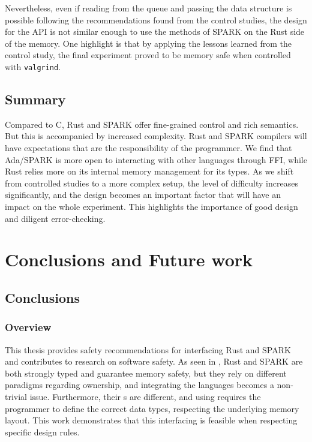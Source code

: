 \documentclass[nomenclature, english, bibtex]{kththesis}
\begin{document}
{\begin{figure}
    \label{fig:memBBqueue}
\end{figure}


Nevertheless, even if reading from the queue and passing the data structure is possible following the recommendations found from the control studies, the design for the API is not similar enough to use the methods of SPARK on the Rust side of the memory.
One highlight is that by applying the lessons learned from the control study, the final experiment proved to be memory safe when controlled with \texttt{valgrind}.

\section{Summary}

Compared to C, Rust and SPARK offer fine-grained control and rich semantics. But this is accompanied by increased complexity. Rust and SPARK compilers will have expectations that are the responsibility of the programmer. We find that Ada/SPARK is more open to interacting with other languages through \gls{FFI}, while Rust relies more on its internal memory management for its types.
As we shift from controlled studies to a more complex setup, the level of difficulty increases significantly, and the design becomes an important factor that will have an impact on the whole experiment. This highlights the importance of good design and diligent error-checking.


\cleardoublepage

\chapter{Conclusions and Future work}
\label{ch:conclusionsAndFutureWork}

\section{Conclusions}
\label{sec:conclusions}

\subsection{Overview}

This thesis provides safety recommendations for interfacing Rust and SPARK and contributes to research on software safety. As seen in , Rust and SPARK are both strongly typed and guarantee memory safety, but they rely on different paradigms regarding ownership, and integrating the languages becomes a non-trivial issue. Furthermore, their s are different, and using  requires the programmer to define the correct data types, respecting the underlying memory layout. This work demonstrates that this interfacing is feasible when respecting specific design rules.

}
\end{document}
